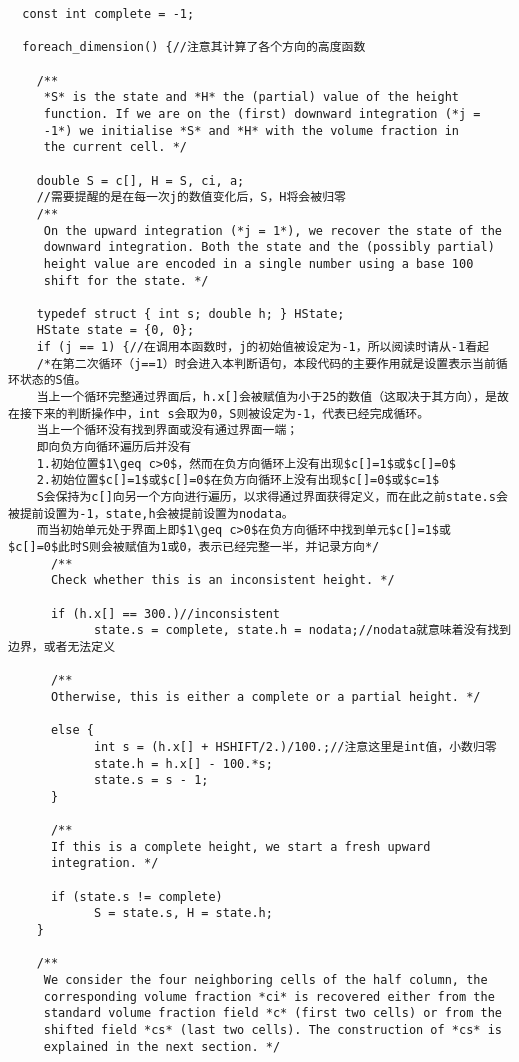 \documentclass[lang=cn,11pt,a4paper]{elegantpaper}
\begin{document}
\begin{verbatim}
  const int complete = -1;

  foreach_dimension() {//注意其计算了各个方向的高度函数

    /**
     *S* is the state and *H* the (partial) value of the height
     function. If we are on the (first) downward integration (*j =
     -1*) we initialise *S* and *H* with the volume fraction in
     the current cell. */

    double S = c[], H = S, ci, a;
    //需要提醒的是在每一次j的数值变化后，S，H将会被归零
    /**
     On the upward integration (*j = 1*), we recover the state of the
     downward integration. Both the state and the (possibly partial)
     height value are encoded in a single number using a base 100
     shift for the state. */
    
    typedef struct { int s; double h; } HState;
    HState state = {0, 0};
    if (j == 1) {//在调用本函数时，j的初始值被设定为-1，所以阅读时请从-1看起
    /*在第二次循环（j==1）时会进入本判断语句，本段代码的主要作用就是设置表示当前循环状态的S值。
    当上一个循环完整通过界面后，h.x[]会被赋值为小于25的数值（这取决于其方向），是故在接下来的判断操作中，int s会取为0，S则被设定为-1，代表已经完成循环。
    当上一个循环没有找到界面或没有通过界面一端；
    即向负方向循环遍历后并没有
    1.初始位置$1\geq c>0$，然而在负方向循环上没有出现$c[]=1$或$c[]=0$
    2.初始位置$c[]=1$或$c[]=0$在负方向循环上没有出现$c[]=0$或$c=1$
    S会保持为c[]向另一个方向进行遍历，以求得通过界面获得定义，而在此之前state.s会被提前设置为-1，state,h会被提前设置为nodata。
    而当初始单元处于界面上即$1\geq c>0$在负方向循环中找到单元$c[]=1$或$c[]=0$此时S则会被赋值为1或0，表示已经完整一半，并记录方向*/
      /**
      Check whether this is an inconsistent height. */

      if (h.x[] == 300.)//inconsistent
	        state.s = complete, state.h = nodata;//nodata就意味着没有找到边界，或者无法定义

      /**
      Otherwise, this is either a complete or a partial height. */
      
      else {
            int s = (h.x[] + HSHIFT/2.)/100.;//注意这里是int值，小数归零
            state.h = h.x[] - 100.*s;
            state.s = s - 1;
      }

      /**
      If this is a complete height, we start a fresh upward
      integration. */
      
      if (state.s != complete)
            S = state.s, H = state.h;
    }
    
    /**
     We consider the four neighboring cells of the half column, the
     corresponding volume fraction *ci* is recovered either from the
     standard volume fraction field *c* (first two cells) or from the
     shifted field *cs* (last two cells). The construction of *cs* is
     explained in the next section. */
    

\end{verbatim}
\end{document}
